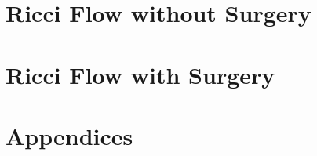 
\part{Ricci Flow without Surgery}
\label{part:kl-without-surgery}

\part{Ricci Flow with Surgery}
\label{part:kl-with-surgery}

\appendix
\part*{Appendices}

